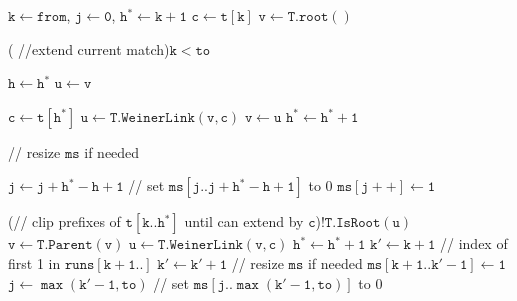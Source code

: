\documentclass{article}
\begin{document}
\begin{algorithm}[t]
\KwIn{Cst of  index string $\mathtt{\bar{s}}$, $\mathtt{T}$, supporting $\mathtt{WeinerLink}$ and $\mathtt{Parent}$; Query string $\mathtt{t}$; Vector $\mathtt{ms}$ initialized at 0; Vector $\mathtt{runs}$; Interval over $\mathtt{t}$, $[\mathtt{from}, \mathtt{to})$}

{$\mathtt{k} \gets \mathtt{from}$, $\mathtt{j} \gets \mathtt{0}$, $\mathtt{h^*} \gets \mathtt{k + 1}$}\; 
{$\mathtt{c} \gets \mathtt{t[k]}$}\; 
{$\mathtt{v} \gets \mathtt{T.root()}$}\; 

\Repeat( //extend current match){$\mathtt{k}<\mathtt{to}$}
{
    {$\mathtt{h} \gets \mathtt{h^*}$}\;
    {$\mathtt{u} \gets \mathtt{v}$}\;

    {
        {$\mathtt{c} \gets \mathtt{t[h^*]}$}\;
        {$\mathtt{u} \gets \mathtt{T.WeinerLink(v, c)}$}\;
        {
            {$\mathtt{v} \gets \mathtt{u}$}\;
            {$\mathtt{h^*} \gets \mathtt{h^*+1}$}\;
        }
    }
    
    {// resize $\mathtt{ms}$ if needed}\;
    
    {$\mathtt{j} \gets \mathtt{j + h^* - h + 1}$ // set $\mathtt{ms[j..j+h^*-h+1]}$ to 0}\;
    {$\mathtt{ms[j++]} \gets \mathtt{1}$}\;

    {
        \Repeat(// clip prefixes of $\mathtt{t[k..h^*]}$ until can extend by $\mathtt{c}$){$\mathtt{!T.IsRoot(u)}$}
        {
            {$\mathtt{v} \gets \mathtt{T.Parent(v)}$}\;
            {$\mathtt{u} \gets \mathtt{T.WeinerLink(v, c)}$}\;
        }
        {$\mathtt{h^*} \gets \mathtt{h^*+1}$}\;
    }
    {$\mathtt{k'} \gets \mathtt{k+1}$ // index of first 1 in $\mathtt{runs[k+1..]}$}\;
    {
        {$\mathtt{k'} \gets \mathtt{k'+1}$}\;
    }
    {// resize $\mathtt{ms}$ if needed}\;
    {$\mathtt{ms[k+1 .. k' - 1]} \gets \mathtt{1}$}\;
    {$\mathtt{j} \gets \mathtt{\max{(k' - 1, to)}}$ // set $\mathtt{ms[j..\max{(k'-1, to)}]}$ to 0}\;
}
\caption{$\mathtt{fill\_ms\_slice(\mathtt{T}, \mathtt{t}, \mathtt{ms}, \mathtt{runs}, \mathtt{from}, \mathtt{to})}$}
\end{algorithm}
\end{document}
